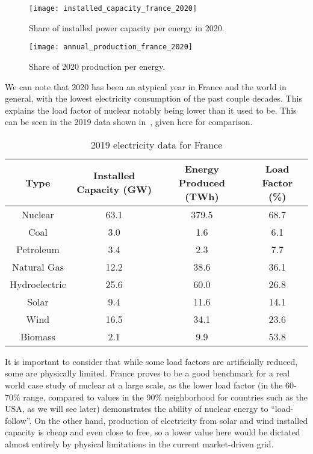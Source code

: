 \begin{figure}[hb]
	\texttt{[image: installed\_capacity\_france\_2020]}
	\caption[Share of installed power capacity per energy]{Share of installed power capacity per energy in 2020.}
\end{figure}


\begin{figure}[hb]
	\texttt{[image: annual\_production\_france\_2020]}
	\caption[Share of 2020 production per energy]{Share of 2020 production per energy.}
\end{figure}



We can note that 2020 has been an atypical year in France and the world in general, with the lowest electricity consumption of the past couple decades. This explains the load factor of nuclear notably being lower than it used to be. This can be seen in the 2019 data shown in~, given here for comparison.

\begin{table*}[ht]
\caption[2019 electricity data for France]{2019 electricity data for France}
\begin{tabular}{ c c c c }
	\toprule
	Type & Installed Capacity (GW) & Energy Produced (TWh) & Load Factor (\%) \\
	\midrule
	Nuclear & 63.1 & 379.5 & 68.7\\
	Coal & 3.0 & 1.6 & 6.1\\
	Petroleum & 3.4 & 2.3 & 7.7\\
	Natural Gas & 12.2 & 38.6 & 36.1\\
	Hydroelectric & 25.6 & 60.0 & 26.8\\
	Solar & 9.4 & 11.6 & 14.1\\
	Wind & 16.5 & 34.1 & 23.6\\
	Biomass & 2.1 & 9.9 & 53.8\\
	\bottomrule
\end{tabular}
\end{table*}


It is important to consider that while some load factors are artificially reduced, some are physically limited. France proves to be a good benchmark for a real world case study of nuclear at a large scale, as the lower load factor (in the 60-70\% range, compared to values in the 90\% neighborhood for countries such as the USA, as we will see later) demonstrates the ability of nuclear energy to “load-follow”. On the other hand, production of electricity from solar and wind installed capacity is cheap and even close to free, so a lower value here would be dictated almost entirely by physical limitations in the current market-driven grid.


